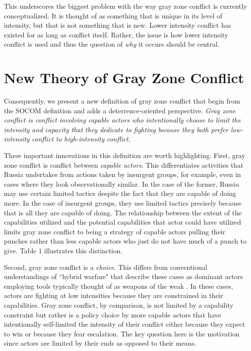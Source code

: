\documentclass[12pt,letterpaper]{article}
\begin{document}
		This underscores the biggest problem with the way gray zone conflict is currently conceptualized. It is thought of as something that is unique in its level of intensity, but that is not something that is new. Lower intensity conflict has existed for as long as conflict itself. Rather, the issue is how lower intensity conflict is used and thus the question of \textit{why} it occurs should be central.
	
\section{New Theory of Gray Zone Conflict}
	Consequently, we present a new definition of gray zone conflict that begin from the SOCOM definition and adds a deterrence-oriented perspective. \textit{Gray zone conflict is conflict involving capable actors who intentionally choose to limit the intensity and capacity that they dedicate to fighting because they both prefer low-intensity conflict to high-intensity conflict.}
		
	Three important innovations in this definition are worth highlighting. First, gray zone conflict is conflict between \textit{capable actors}. This differentiates activities that Russia undertakes from actions taken by insurgent groups, for example, even in cases where they look observationally similar. In the case of the former, Russia may use certain limited tactics despite the fact that they are capable of doing more. In the case of insurgent groups, they use limited tactics precisely because that is all they are capable of doing. The relationship between the extent of the capabilities utilized and the potential capabilities that actor could have utilized limits gray zone conflict to being a strategy of capable actors pulling their punches rather than less capable actors who just do not have much of a punch to give. Table 1 illustrates this distinction.
		
	Second, gray zone conflict is a \textit{choice}. This differs from conventional understandings of ``hybrid warfare" that describe these cases as dominant actors employing tools typically thought of as weapons of the weak  \citep{galeotti_hybridambiguousnonlinear_2016}. In these cases, actors are fighting at low intensities because they are constrained in their capabilities. Gray zone conflict, by comparison, is not limited by a capability constraint but rather is a policy choice by more capable actors that have intentionally self-limited the intensity of their conflict either because they expect to win or because they fear escalation. The key question here is the motivation since actors are limited by their ends as opposed to their means.
		
\end{document}
